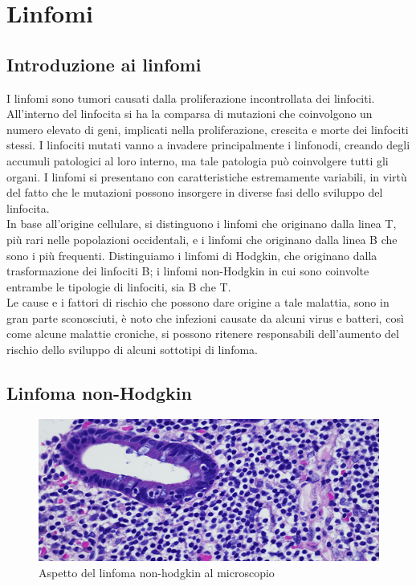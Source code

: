 \chapter{Linfomi}

\section{Introduzione ai linfomi}
I linfomi sono tumori causati dalla proliferazione incontrollata dei linfociti.
All’interno del linfocita si ha la comparsa di mutazioni che coinvolgono un numero elevato di geni, 
implicati nella proliferazione, crescita e morte dei linfociti stessi.
I linfociti mutati vanno a invadere principalmente i linfonodi, creando degli accumuli patologici al loro interno, 
ma tale patologia può coinvolgere tutti gli organi.  
I linfomi si presentano con caratteristiche estremamente variabili, in virtù del fatto che le mutazioni 
possono insorgere in diverse fasi dello sviluppo del linfocita\cite{LINFOMIAIL}.\\

In base all’origine cellulare, si distinguono i linfomi che originano dalla linea T, 
più rari nelle popolazioni occidentali, e i linfomi che originano dalla linea B che sono i più frequenti. 
Distinguiamo i linfomi di Hodgkin, che originano dalla trasformazione dei linfociti B; 
i linfomi non-Hodgkin in cui sono coinvolte entrambe le tipologie di linfociti, sia B che T.\\

Le cause e i fattori di rischio che possono dare origine a tale malattia, sono in gran parte sconosciuti, 
è noto che infezioni causate da alcuni virus e batteri, così come alcune malattie croniche, 
si possono ritenere responsabili dell’aumento del rischio dello sviluppo di alcuni sottotipi di linfoma\cite{LINFOMIAIL}.\\

\section{Linfoma non-Hodgkin}

\begin{figure}[h]
    \begin{center}
    \includegraphics[width=0.8\columnwidth]{img/Linfoma-non-Hodgkin.jpeg}
    \end{center}
    \caption[Aspetto del linfoma non-hodgkin al microscopio]{Aspetto del linfoma non-hodgkin al microscopio
    \cite{img3}}

\end{figure}

